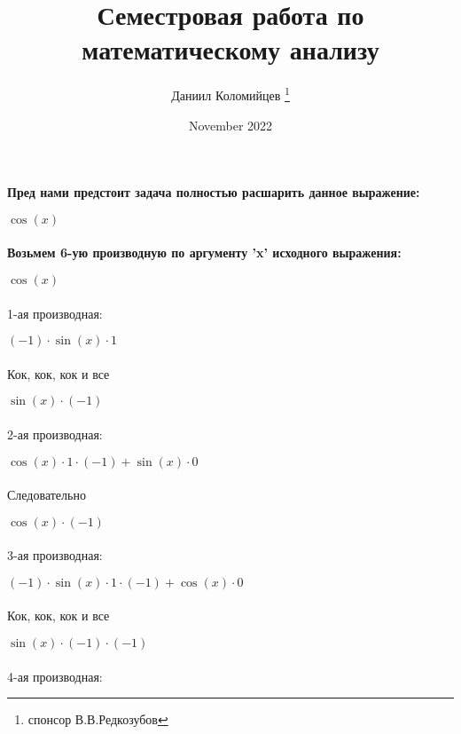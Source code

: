 \documentclass[a4paper, 12pt] {article}
\title{Семестровая работа по математическому анализу}
\author{Даниил Коломийцев \thanks{спонсор В.В.Редкозубов}}
\date{November 2022}
\begin{document}
\maketitle
\newpage

\textbf{Пред нами предстоит задача полностью расшарить данное выражение:}

\begin{math}
 \cos (x)
\end{math}
\\ 
\\ 
\textbf{Возьмем 6-ую производную по аргументу 'x' исходного выражения:}

\begin{math}
 \cos (x)
\end{math}
\\ 
\\ 
1-ая производная:

\begin{math}
(-1) \cdot  \sin (x) \cdot 1
\end{math}
\\ 
\\ 
Кок, кок, кок и все

\begin{math}
 \sin (x) \cdot (-1)
\end{math}
\\ 
\\ 
2-ая производная:

\begin{math}
 \cos (x) \cdot 1 \cdot (-1)+ \sin (x) \cdot 0
\end{math}
\\ 
\\ 
Следовательно

\begin{math}
 \cos (x) \cdot (-1)
\end{math}
\\ 
\\ 
3-ая производная:

\begin{math}
(-1) \cdot  \sin (x) \cdot 1 \cdot (-1)+ \cos (x) \cdot 0
\end{math}
\\ 
\\ 
Кок, кок, кок и все

\begin{math}
 \sin (x) \cdot (-1) \cdot (-1)
\end{math}
\\ 
\\ 
4-ая производная:
\end{document}
